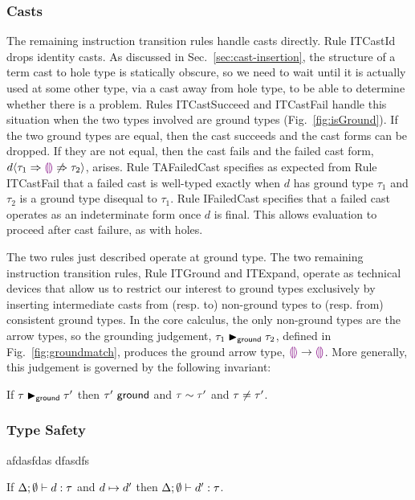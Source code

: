 \subsubsection{Casts}
The remaining instruction transition rules handle casts directly. Rule {ITCastId} drops identity casts.  As discussed in Sec.~\ref{sec:cast-insertion}, the structure of a term cast to hole type is statically obscure, so we need to wait until it is actually used at some other type, via a cast away from hole type, to be able to determine whether there is a problem. Rules {ITCastSucceed} and {ITCastFail} handle this situation when the two types involved are ground types (Fig.~\ref{fig:isGround}). If the two ground types are equal, then the cast succeeds and the cast forms can be dropped. If they are not equal, then the cast fails and the failed cast form, $d \langle{\tau_1}\Rightarrow{\textcolor{violet}{\llparenthesis}\textcolor{violet}{\rrparenthesis}}\not\Rightarrow{\tau_2}\rangle$, arises. Rule {TAFailedCast} specifies as expected from Rule {ITCastFail} that a failed cast is well-typed exactly when $d$ has ground type $\tau_1$ and $\tau_2$ is a ground type disequal to $\tau_1$. Rule {IFailedCast} specifies that a failed cast operates as an indeterminate form once $d$ is final. This allows evaluation to proceed after cast failure, as with holes.

The two rules just described operate at ground type. The two remaining instruction transition rules, Rule {ITGround} and {ITExpand}, operate as technical devices that allow us to restrict our interest to ground types exclusively by inserting intermediate casts from (resp. to) non-ground types to (resp. from) consistent ground types. In the core calculus, the only non-ground types are the arrow types, so the grounding judgement, $\tau_1 \blacktriangleright_{\mathsf{ground}} \tau_2$, defined in Fig.~\ref{fig:groundmatch}, produces the ground arrow type, $\textcolor{violet}{\llparenthesis}\textcolor{violet}{\rrparenthesis} \rightarrow \textcolor{violet}{\llparenthesis}\textcolor{violet}{\rrparenthesis}$. More generally, this judgement is governed by the following invariant:
\begin{lem}[Grounding] 
  If $\tau \blacktriangleright_{\mathsf{ground}} \tau'$
  then $\tau'~\mathsf{ground}$
  and $\tau \sim \tau'$
  and $\tau\neq\tau'$.
\end{lem}

\subsubsection{Type Safety} afdasfdas dfasdfs
\begin{thm}[Preservation]
  If $\Delta; \emptyset \vdash d : \tau$ and
  $d \mapsto d'$ then
  $\Delta; \emptyset \vdash d' : \tau$.
\end{thm}

